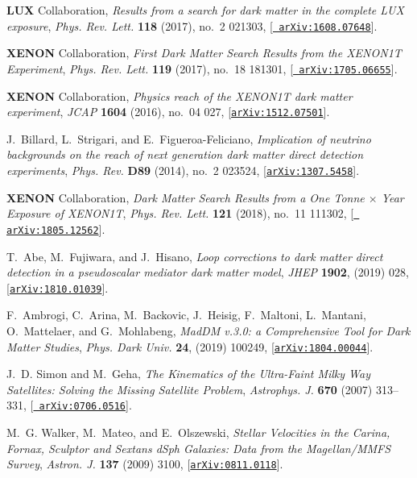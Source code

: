 \documentclass[review]{elsarticle}
\begin{document}
\begin{thebibliography}{100}
{\bf LUX} Collaboration,  {\it {Results from a search for
  dark matter in the complete LUX exposure}},  {\em Phys. Rev. Lett.} {\bf 118}
  (2017), no.~2 021303, [\href{http://arxiv.org/abs/1608.07648}{{\tt
  arXiv:1608.07648}}].

{\bf XENON} Collaboration, {\it {First Dark Matter Search
  Results from the XENON1T Experiment}},  {\em Phys. Rev. Lett.} {\bf 119}
  (2017), no.~18 181301, [\href{http://arxiv.org/abs/1705.06655}{{\tt
  arXiv:1705.06655}}].

{\bf XENON} Collaboration, {\it {Physics reach of the XENON1T
  dark matter experiment}},  {\em JCAP} {\bf 1604} (2016), no.~04 027,
  [\href{http://arxiv.org/abs/1512.07501}{{\tt arXiv:1512.07501}}].

J.~Billard, L.~Strigari, and E.~Figueroa-Feliciano, {\it {Implication of
  neutrino backgrounds on the reach of next generation dark matter direct
  detection experiments}},  {\em Phys. Rev.} {\bf D89} (2014), no.~2 023524,
  [\href{http://arxiv.org/abs/1307.5458}{{\tt arXiv:1307.5458}}].

{\bf XENON} Collaboration, {\it {Dark Matter Search Results
  from a One Tonne $\times$ Year Exposure of XENON1T}}, {\em Phys. Rev. Lett.} {\bf 121}
  (2018), no.~11 111302, [\href{http://arxiv.org/abs/1805.12562}{{\tt
  arXiv:1805.12562}}].

T.~Abe, M.~Fujiwara, and J.~Hisano, {\it {Loop corrections to dark matter
  direct detection in a pseudoscalar mediator dark matter model}},
  {\em JHEP} {\bf 1902}, (2019) 028, 
  [\href{http://arxiv.org/abs/1810.01039}{{\tt arXiv:1810.01039}}].

F.~Ambrogi, C.~Arina, M.~Backovic, J.~Heisig, F.~Maltoni, L.~Mantani,
  O.~Mattelaer, and G.~Mohlabeng, {\it {MadDM v.3.0: a Comprehensive Tool for
  Dark Matter Studies}},  
   {\em Phys. Dark Univ.}  {\bf 24},  (2019) 100249, 
  [\href{http://arxiv.org/abs/1804.00044}{{\tt arXiv:1804.00044}}].

J.~D. Simon and M.~Geha, {\it {The Kinematics of the Ultra-Faint Milky Way
  Satellites: Solving the Missing Satellite Problem}},  {\em Astrophys. J.}
  {\bf 670} (2007) 313--331, [\href{http://arxiv.org/abs/0706.0516}{{\tt
  arXiv:0706.0516}}].

M.~G. Walker, M.~Mateo, and E.~Olszewski, {\it {Stellar Velocities in the
  Carina, Fornax, Sculptor and Sextans dSph Galaxies: Data from the
  Magellan/MMFS Survey}},  {\em Astron. J.} {\bf 137} (2009) 3100,
  [\href{http://arxiv.org/abs/0811.0118}{{\tt arXiv:0811.0118}}].


\end{thebibliography}
\end{document}
